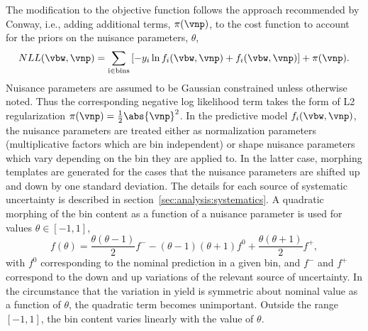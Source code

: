 The modification to the objective function follows the approach recommended by Conway, i.e., adding additional terms, $\pi(\vnp)$, to the cost function to account for the priors on the nuisance parameters, $\theta$,
\begin{equation}
\label{eqn:analysis:method:mel_nll_full}
    NLL(\vbw, \vnp) = \sum_{\mathrm{i \in bins}} \left[-y_{i}\ln f_{i}(\vbw, \vnp) + f_{i}(\vbw, \vnp)\right] + \pi(\vnp).
\end{equation}
Nuisance parameters are assumed to be Gaussian constrained unless otherwise noted. Thus the corresponding negative log likelihood term takes the form of L2 regularization $\pi(\vnp) = \frac{1}{2} \abs{\vnp}^2$. In the predictive model $f_{i}(\vbw, \vnp)$, the nuisance parameters are treated either as normalization parameters (multiplicative factors which are bin independent) or shape nuisance parameters which vary depending on the bin they are applied to.  In the latter case, morphing templates are generated for the cases that the nuisance parameters are shifted up and down by one standard deviation. The details for each source of systematic uncertainty is described in section~\ref{sec:analysis:systematics}. A quadratic morphing of the bin content as a function of a nuisance parameter is used for values $\theta \in [-1, 1]$,
\begin{equation}
\label{eqn:analysis:method:shape_param}
    f(\theta) = \frac{\theta(\theta - 1)}{2}f^{-} - (\theta - 1)(\theta +1)f^{0} + \frac{\theta(\theta + 1)}{2}f^{+},
\end{equation}
\noindent with $f^{0}$ corresponding to the nominal prediction in a given bin, and $f^{-}$ and $f^{+}$ correspond to the down and up variations of the relevant source of uncertainty. In the circumstance that the variation in yield is symmetric about nominal value as a function of $\theta$, the quadratic term becomes unimportant.  Outside the range $[-1, 1]$, the bin content varies linearly with the value of $\theta$.


